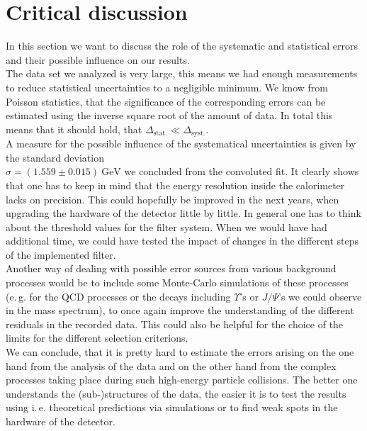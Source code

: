\documentclass[twocolumn,
			   showpacs,%
               nofootinbib,
               aps,%
               prd,
               notitlepage,
               showkeys,
               10pt]{revtex4-1}
\begin{document}
\section{Critical discussion}
In this section we want to discuss the role of the systematic and statistical errors and their possible influence on our results.\\
The data set we analyzed is very large, this means we had enough measurements to reduce statistical uncertainties to a negligible minimum. We know from Poisson statistics, that the significance of the corresponding errors can be estimated using the inverse square root of the amount of data. In total this means that it should hold, that $\Delta_{\mathrm{stat.}} \ll \Delta_{\mathrm{syst.}}$. \\
A measure for the possible influence of the systematical uncertainties is given by the standard deviation \\ $\sigma = (1.559 \pm 0.015) \ \text{GeV}$ we concluded from the convoluted fit. It clearly shows that one has to keep in mind that the energy resolution inside the calorimeter lacks on precision. This could hopefully be improved in the next years, when upgrading the hardware of the detector little by little.  In general one has to think about the threshold values for the filter system. When we would have had additional time, we could have tested the impact of changes in the different steps of the implemented filter. \\
Another way of dealing with possible error sources from various background processes would be to include some Monte-Carlo simulations of these processes (e.\,g. for the QCD processes or the decays including $\Upsilon$'s or $J/\Psi$'s we could observe in the mass spectrum), to once again improve the understanding of the different residuals in the recorded data. This could also be helpful for the choice of the limits for the different selection criterions. \\
We can conclude, that it is pretty hard to estimate the errors arising on the one hand from the analysis of the data and on the other hand from the complex processes taking place during such high-energy particle collisions. The better one understands the (sub-)structures of the data, the easier it is to test the results using i.\,e. theoretical predictions via simulations or to find weak spots in the hardware of the detector.
\end{document}
